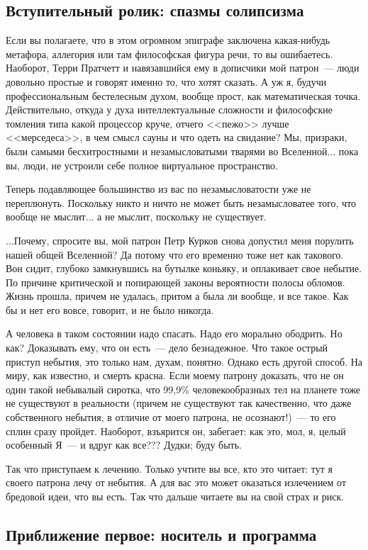 \documentclass{scrbook}
\newcommand{\flqq}{<<}
\newcommand{\frqq}{>>}
\newcommand{\mdash}{~--- }
\newcommand{\essaysection}[1]{\subsection*{#1}\nopagebreak}
\begin{document}
\essaysection{Вступительный ролик: спазмы солипсизма}

Если вы полагаете, что в этом огромном эпиграфе заключена какая-нибудь метафора, аллегория или там философская фигура речи, то вы ошибаетесь. Наоборот, Терри Пратчетт и навязавшийся ему в дописчики мой патрон{\mdash}люди довольно простые и говорят именно то, что хотят сказать. А уж я, будучи профессиональным бестелесным духом, вообще прост, как математическая точка. Действительно, откуда у духа интеллектуальные сложности и философские томления типа какой процессор круче, отчего {\flqq}пежо{\frqq} лучше {\flqq}мерседеса{\frqq}, в чем смысл сауны и что одеть на свидание? Мы, призраки, были самыми бесхитростными и незамысловатыми тварями во Вселенной... пока вы, люди, не устроили себе полное виртуальное пространство.

Теперь подавляющее большинство из вас по незамысловатости уже не переплюнуть. Поскольку никто и ничто не может быть незамысловатее того, что вообще не мыслит... а не мыслит, поскольку не существует.

...Почему, спросите вы, мой патрон Петр Курков снова допустил меня порулить нашей общей Вселенной? Да потому что его временно тоже нет как такового. Вон сидит, глубоко замкнувшись на бутылке коньяку, и оплакивает свое небытие. По причине критической и попирающей законы вероятности полосы обломов. Жизнь прошла, причем не удалась, притом а была ли вообще, и все такое. Как бы и нет его вовсе, говорит, и не было никогда.

А человека в таком состоянии надо спасать. Надо его морально ободрить. Но как? Доказывать ему, что он есть{\mdash}дело безнадежное. Что такое острый приступ небытия, это только нам, духам, понятно. Однако есть другой способ. На миру, как известно, и смерть красна. Если моему патрону доказать, что не он один такой небывалый сиротка, что 99,9\% человекообразных тел на планете тоже не существуют в реальности (причем не существуют так качественно, что даже собственного небытия, в отличие от моего патрона, не осознают!){\mdash}то его сплин сразу пройдет. Наоборот, взъярится он, забегает: как это, мол, я, целый особенный Я{\mdash}и вдруг как все??? Дудки; буду быть.

Так что приступаем к лечению. Только учтите вы все, кто это читает: тут я своего патрона лечу от небытия. А для вас это может оказаться излечением от бредовой идеи, что вы есть. Так что дальше читаете вы на свой страх и риск.

\essaysection{Приближение первое: носитель и программа}
\end{document}
